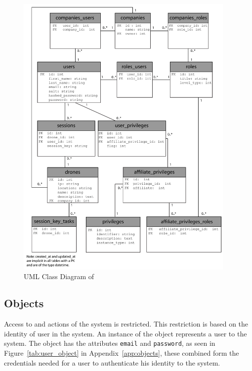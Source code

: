\begin{figure}[htb]
    \centering
    \includegraphics[width=0.95\textwidth]{gfx/UML_model.pdf}
    \caption{UML Class Diagram of \projectname{}}
    \label{fig:UML_class_diagram}
\end{figure}


\subsection{Objects}
Access to and actions of the system is restricted.
This restriction is based on the identity of user in the system.
An instance of the  object represents a user to the system.
The  object has the attributes \verb+email+ and \verb+password+, as seen in Figure~\ref{tab:user_object} in Appendix~\ref{app:objects}, these combined form the credentials needed for a user to authenticate his identity to the system. \\


